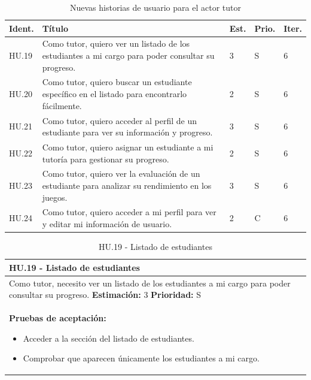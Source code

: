 \begin{table}[H]
\centering
\begin{tabularx}{\textwidth}{|X|p{}|X|X|X|}
\hline
\textbf{Ident.} & \textbf{Título} & \textbf{Est.} & \textbf{Prio.} & \textbf{Iter.} \\
\hline
HU.19 & Como tutor, quiero ver un listado de los estudiantes a mi cargo para poder consultar su progreso. & 3 & S & 6 \\
\hline
HU.20 & Como tutor, quiero buscar un estudiante específico en el listado para encontrarlo fácilmente. & 2 & S & 6 \\
\hline
HU.21 & Como tutor, quiero acceder al perfil de un estudiante para ver su información y progreso. & 3 & S & 6 \\
\hline
HU.22 & Como tutor, quiero asignar un estudiante a mi tutoría para gestionar su progreso. & 2 & S & 6 \\
\hline
HU.23 & Como tutor, quiero ver la evaluación de un estudiante para analizar su rendimiento en los juegos. & 3 & S & 6 \\
\hline
HU.24 & Como tutor, quiero acceder a mi perfil para ver y editar mi información de usuario. & 2 & C & 6 \\
\hline
\end{tabularx}
\caption{Nuevas historias de usuario para el actor tutor}
\label{tab:nuevas_historias_tutor}
\end{table}

\begin{table}[H]
\centering
\begin{tabularx}{\textwidth}{|X|}
\hline
\textbf{HU.19 - Listado de estudiantes}  \\
\hline
Como tutor, necesito ver un listado de los estudiantes a mi cargo para poder consultar su progreso.
\clearpage
\textbf{Estimación: }3
\clearpage
\textbf{Prioridad: }S
\\
\hline
\textbf{Pruebas de aceptación:}
\begin{itemize}
    \item Acceder a la sección del listado de estudiantes.
    \item Comprobar que aparecen únicamente los estudiantes a mi cargo.
\end{itemize}
\\
\hline
\end{tabularx}
\caption{HU.19 - Listado de estudiantes}
\end{table}

